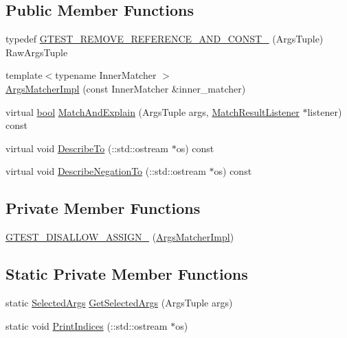 \subsection*{Public Member Functions}
\begin{DoxyCompactItemize}
\item 
typedef \hyperlink{classtesting_1_1internal_1_1ArgsMatcherImpl_a7b0cadc369c0c20cd254cc2052782301}{G\+T\+E\+S\+T\+\_\+\+R\+E\+M\+O\+V\+E\+\_\+\+R\+E\+F\+E\+R\+E\+N\+C\+E\+\_\+\+A\+N\+D\+\_\+\+C\+O\+N\+S\+T\+\_\+} (Args\+Tuple) Raw\+Args\+Tuple
\item 
{\footnotesize template$<$typename Inner\+Matcher $>$ }\\\hyperlink{classtesting_1_1internal_1_1ArgsMatcherImpl_a7f7a9a826d130d11fe30633d79f59a06}{Args\+Matcher\+Impl} (const Inner\+Matcher \&inner\+\_\+matcher)
\item 
virtual \hyperlink{classbool}{bool} \hyperlink{classtesting_1_1internal_1_1ArgsMatcherImpl_a60383b3073a61f9d82cbf31fe19e6bfa}{Match\+And\+Explain} (Args\+Tuple args, \hyperlink{classtesting_1_1MatchResultListener}{Match\+Result\+Listener} $\ast$listener) const
\item 
virtual void \hyperlink{classtesting_1_1internal_1_1ArgsMatcherImpl_a8e057f67b368f7d94aeb0ddd35837c94}{Describe\+To} (\+::std\+::ostream $\ast$os) const
\item 
virtual void \hyperlink{classtesting_1_1internal_1_1ArgsMatcherImpl_ac8ff5369879836567cedb5434bcca5b9}{Describe\+Negation\+To} (\+::std\+::ostream $\ast$os) const
\end{DoxyCompactItemize}
\subsection*{Private Member Functions}
\begin{DoxyCompactItemize}
\item 
\hyperlink{classtesting_1_1internal_1_1ArgsMatcherImpl_a6ef9d2868258271039d001e20f5f7fb2}{G\+T\+E\+S\+T\+\_\+\+D\+I\+S\+A\+L\+L\+O\+W\+\_\+\+A\+S\+S\+I\+G\+N\+\_\+} (\hyperlink{classtesting_1_1internal_1_1ArgsMatcherImpl}{Args\+Matcher\+Impl})
\end{DoxyCompactItemize}
\subsection*{Static Private Member Functions}
\begin{DoxyCompactItemize}
\item 
static \hyperlink{classtesting_1_1internal_1_1ArgsMatcherImpl_ab061679f6251e56ccbedaf0c316d00ff}{Selected\+Args} \hyperlink{classtesting_1_1internal_1_1ArgsMatcherImpl_a168a7d6a82bd20fd6b1c777ab64c34a5}{Get\+Selected\+Args} (Args\+Tuple args)
\item 
static void \hyperlink{classtesting_1_1internal_1_1ArgsMatcherImpl_a2ea95d7970a1874c9616e42009ae53b0}{Print\+Indices} (\+::std\+::ostream $\ast$os)
\end{DoxyCompactItemize}
